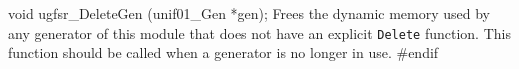 void ugfsr_DeleteGen (unif01_Gen *gen);
\endcode
 \tab  Frees the dynamic memory used by any generator of this module
  that does not have an explicit {\tt Delete} function.
  This function should be called when a generator
  is no longer in use.
 \endtab
\code
\hide
#endif
\endhide
\endcode


\iffalse  %
\bigskip
\hrule
\bigskip
{
For other GFSR generators, see also

\begin{itemize}
\item {\tt uwu\_CreatePentaWuC}     %
\end{itemize}
}
\fi  %
